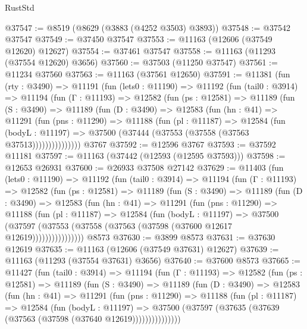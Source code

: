 \begin{lexlean}{RustStd}
\begin{coremodule}
@37547 := @8519 (@8629 (@3883 (@4252 @3503) @3893))
@37548 := @37542 @37547
@37549 := @37450 @37547
@37553 := @11163 (@12606 (@37549 @12620) @12627)
@37554 := @37461 @37547
@37558 := @11163 (@11293 (@37554 @12620) @3656)
@37560 := @37503 (@11250 @37547)
@37561 := @11234 @37560
@37563 := @11163 (@37561 @12650)
@37591 := @11381
    (fun (rty : @3490) =>
    @11191
      (fun (lets0 : @11190) =>
      @11192
        (fun (tail0 : @3914) =>
        @11194
          (fun (Γ : @11193) =>
          @12582
            (fun (ps : @12581) =>
            @11189
              (fun (S : @3490) =>
              @11189
                (fun (D : @3490) =>
                @12583
                  (fun (hn : @41) =>
                  @11291
                    (fun (pns : @11290) =>
                    @11188
                      (fun (pl : @11187) =>
                      @12584
                        (fun (bodyL : @11197) =>
                        @37500 (@37444 (@37553 (@37558 (@37563 @37513)))))))))))))))
    @3767
@37592 := @12596 @3767
@37593 := @37592 @11181
@37597 := @11163 (@37442 (@12593 (@12595 @37593)))
@37598 := @12653 @26931
@37600 := @26933 @37508 @27142
@37629 := @11403
    (fun (lets0 : @11190) =>
    @11192
      (fun (tail0 : @3914) =>
      @11194
        (fun (Γ : @11193) =>
        @12582
          (fun (ps : @12581) =>
          @11189
            (fun (S : @3490) =>
            @11189
              (fun (D : @3490) =>
              @12583
                (fun (hn : @41) =>
                @11291
                  (fun (pns : @11290) =>
                  @11188
                    (fun (pl : @11187) =>
                    @12584
                      (fun (bodyL : @11197) =>
                      @37500
                        (@37597
                          (@37553 (@37558 (@37563 (@37598 (@37600 @12617 @12619))))))))))))))))
    @8573
@37630 := @3899 @8573
@37631 := @37630 @12619
@37635 := @11163 (@12606 (@37549 @37631) @12627)
@37639 := @11163 (@11293 (@37554 @37631) @3656)
@37640 := @37600 @8573
@37665 := @11427
    (fun (tail0 : @3914) =>
    @11194
      (fun (Γ : @11193) =>
      @12582
        (fun (ps : @12581) =>
        @11189
          (fun (S : @3490) =>
          @11189
            (fun (D : @3490) =>
            @12583
              (fun (hn : @41) =>
              @11291
                (fun (pns : @11290) =>
                @11188
                  (fun (pl : @11187) =>
                  @12584
                    (fun (bodyL : @11197) =>
                    @37500 (@37597 (@37635 (@37639 (@37563 (@37598 (@37640 @12619)))))))))))))))

\end{coremodule}
\end{lexlean}
